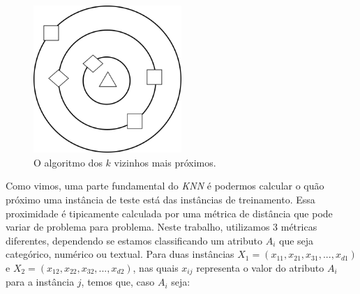 \begin{figure}[ht!]
\centering
\includegraphics[width=0.5\textwidth]{figures/knn.png}
\caption{O algoritmo dos $k$ vizinhos mais próximos.}
\label{fig::knn}
\end{figure}

Como vimos, uma parte fundamental do \textit{KNN} é podermos calcular o quão próximo uma instância de teste está das instâncias de treinamento. 
Essa proximidade é tipicamente calculada por uma métrica de distância que pode variar de problema para problema. Neste trabalho, utilizamos 3 métricas diferentes, dependendo se estamos classificando um atributo $A_i$ que seja categórico, numérico ou textual. Para duas instâncias $X_1 =  (x_{11}, x_{21}, x_{31}, ..., x_{d1})$ e $X_2 = (x_{12}, x_{22}, x_{32}, ..., x_{d2})$, nas quais $x_{ij}$ representa o valor do atributo $A_i$ para a instância $j$, temos que, caso $A_i$ seja:

